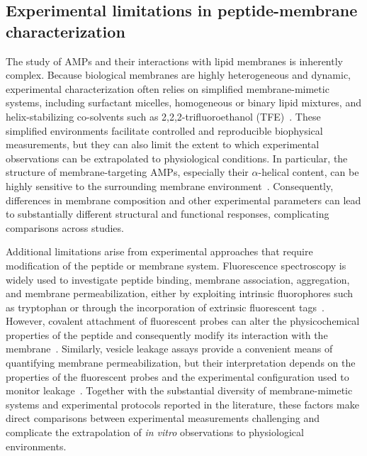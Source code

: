 \subsection{Experimental limitations in peptide-membrane characterization}

The study of AMPs and their interactions with lipid membranes is inherently complex. Because biological membranes are highly heterogeneous and dynamic, experimental characterization often relies on simplified membrane-mimetic systems, including surfactant micelles, homogeneous or binary lipid mixtures, and helix-stabilizing co-solvents such as 2,2,2-trifluoroethanol (TFE)~\cite{paper_paula,experiments_1,experiments_2,experiments_3}. These simplified environments facilitate controlled and reproducible biophysical measurements, but they can also limit the extent to which experimental observations can be extrapolated to physiological conditions. In particular, the structure of membrane-targeting AMPs, especially their $\alpha$-helical content, can be highly sensitive to the surrounding membrane environment~\cite{experiment_4,experiment_5}. Consequently, differences in membrane composition and other experimental parameters can lead to substantially different structural and functional responses, complicating comparisons across studies.

Additional limitations arise from experimental approaches that require modification of the peptide or membrane system. Fluorescence spectroscopy is widely used to investigate peptide binding, membrane association, aggregation, and membrane permeabilization, either by exploiting intrinsic fluorophores such as tryptophan or through the incorporation of extrinsic fluorescent tags~\cite{fluo_1,fluo_3,fluo_4}. However, covalent attachment of fluorescent probes can alter the physicochemical properties of the peptide and consequently modify its interaction with the membrane~\cite{fluo_2}. Similarly, vesicle leakage assays provide a convenient means of quantifying membrane permeabilization, but their interpretation depends on the properties of the fluorescent probes and the experimental configuration used to monitor leakage~\cite{fluo_3,fluo_4}. Together with the substantial diversity of membrane-mimetic systems and experimental protocols reported in the literature, these factors make direct comparisons between experimental measurements challenging and complicate the extrapolation of \textit{in vitro} observations to physiological environments.

